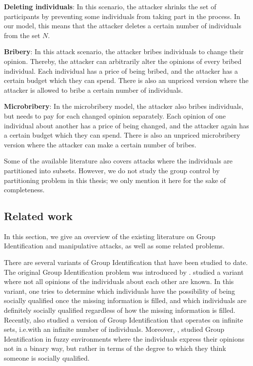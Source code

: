 \documentclass[
    12pt,               %
    a4paper,            %
    bibtotoc,           %
    pointlessnumbers,   %
    ngerman,            %
    titlepage,          %
    leqno,              %
    ]{scrarticle}       %
\begin{document}
\textbf{Deleting individuals}: In this scenario, the attacker shrinks the set of participants by preventing some individuals from taking part in the process. In our model, this means that the attacker deletes a certain number of individuals from the set $N$.

\textbf{Bribery}: In this attack scenario, the attacker bribes individuals to change their opinion. Thereby, the attacker can arbitrarily alter the opinions of every bribed individual. Each individual has a price of being bribed, and the attacker has a certain budget which they can spend. There is also an unpriced version where the attacker is allowed to bribe a certain number of individuals.

\textbf{Microbribery}: In the microbribery model, the attacker also bribes individuals, but needs to pay for each changed opinion separately. Each opinion of one individual about another has a price of being changed, and the attacker again has a certain budget which they can spend. There is also an unpriced microbribery version where the attacker can make a certain number of bribes.

Some of the available literature also covers attacks where the individuals are partitioned into subsets. However, we do not study the group control by partitioning problem in this thesis; we only mention it here for the sake of completeness.



\subsection{Related work}
\label{sec:intro_related}

In this section, we give an overview of the existing literature on Group Identification and manipulative attacks, as well as some related problems.

There are several variants of Group Identification that have been studied to date. The original Group Identification problem was introduced by \textcite{K93,KR97}. \textcite{ERY17,R18} studied a variant where not all opinions of the individuals about each other are known. In this variant, one tries to determine which individuals have the possibility of being socially qualified once the missing information is filled, and which individuals are definitely socially qualified regardless of how the missing information is filled. Recently, \textcite{FT20} also studied a version of Group Identification that operates on infinite sets, i.e.\@ with an infinite number of individuals. Moreover, \textcite{FT22}, studied Group Identification in fuzzy environments where the individuals express their opinions not in a binary way, but rather in terms of the degree to which they think someone is socially qualified.
\end{document}
